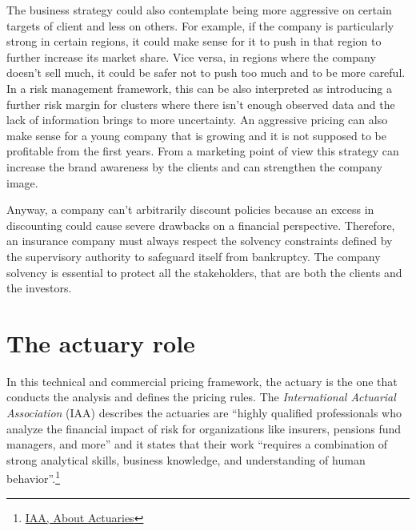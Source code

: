 \documentclass[a4paper, nobind]{templates/ociamthesis}
\theoremstyle{definition}
\theoremstyle{definition}
\theoremstyle{definition}
\theoremstyle{remark}
\begin{document}
The business strategy could also contemplate being more aggressive on certain targets of client and less on others. For example, if the company is particularly strong in certain regions, it could make sense for it to push in that region to further increase its market share. Vice versa, in regions where the company doesn't sell much, it could be safer not to push too much and to be more careful. In a risk management framework, this can be also interpreted as introducing a further risk margin for clusters where there isn't enough observed data and the lack of information brings to more uncertainty. An aggressive pricing can also make sense for a young company that is growing and it is not supposed to be profitable from the first years. From a marketing point of view this strategy can increase the brand awareness by the clients and can strengthen the company image.

Anyway, a company can't arbitrarily discount policies because an excess in discounting could cause severe drawbacks on a financial perspective. Therefore, an insurance company must always respect the solvency constraints defined by the supervisory authority to safeguard itself from bankruptcy. The company solvency is essential to protect all the stakeholders, that are both the clients and the investors.

\hypertarget{the-actuary-role}{%
\section{The actuary role}\label{the-actuary-role}}

In this technical and commercial pricing framework, the actuary is the one that conducts the analysis and defines the pricing rules. The \emph{International Actuarial Association} (IAA) describes the actuaries are ``highly qualified professionals who analyze the financial impact of risk for organizations like insurers, pensions fund managers, and more'' and it states that their work ``requires a combination of strong analytical skills, business knowledge, and understanding of human behavior''.\footnote{\href{https://www.actuaries.org/iaa/IAA/About_the_IAA/About_Actuaries/About\%20Actuaries.aspx}{IAA, About Actuaries}}
\end{document}
